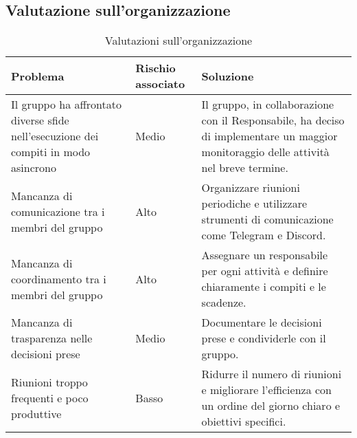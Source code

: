\subsection{Valutazione sull'organizzazione}
\begin{table}[h!]
    \centering
    \begin{tabularx}{\textwidth}{|X|p{}|X|}\hline
    \rowcolor[HTML]{FFD700}
    \textbf{Problema} & \textbf{Rischio associato} & \textbf{Soluzione} \\ 
    \hline
    Il gruppo ha affrontato diverse sfide nell’esecuzione dei compiti in modo asincrono & Medio
    & Il gruppo, in collaborazione con il Responsabile, ha deciso di implementare un maggior monitoraggio delle
    attività nel breve termine. \\
    \hline
    Mancanza di comunicazione tra i membri del gruppo & Alto & 
    Organizzare riunioni periodiche e utilizzare strumenti di comunicazione come Telegram e Discord. \\ 
    \hline
    Mancanza di coordinamento tra i membri del gruppo & Alto & 
    Assegnare un responsabile per ogni attività e definire chiaramente i compiti e le scadenze. \\ 
    \hline
    Mancanza di trasparenza nelle decisioni prese & Medio & 
    Documentare le decisioni prese e condividerle con il gruppo. \\ 
    \hline
    Riunioni troppo frequenti e poco produttive & Basso & 
    Ridurre il numero di riunioni e migliorare l'efficienza con un ordine del giorno chiaro e obiettivi specifici. \\
    \hline
    \end{tabularx}
    \caption{Valutazioni sull'organizzazione}
    \label{tab:valutazioni_organizzazione}
\end{table}
\newpage
